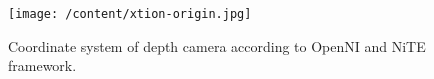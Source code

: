 \begin{figure}
	[h] \centering 
	\texttt{[image: /content/xtion-origin.jpg]} \caption{Coordinate system of depth camera according to OpenNI and NiTE framework. \cite{12} } \label{fg:xtion:origin} 
\end{figure}
